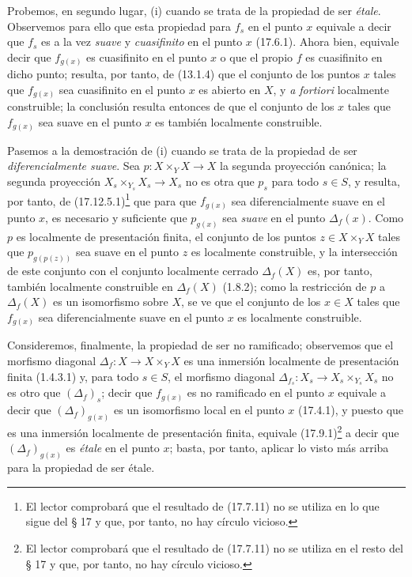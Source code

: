 Probemos, en segundo lugar, (i) cuando se trata de la propiedad de ser \emph{étale}. Observemos para ello que esta propiedad para $f_s$ en el punto $x$ equivale a decir que $f_s$ es a la vez \emph{suave} y \emph{cuasifinito} en el punto $x$ (17.6.1). Ahora bien, equivale decir que $f_{g(x)}$ es cuasifinito en el punto $x$ o que el propio $f$ es cuasifinito en dicho punto; resulta, por tanto, de (13.1.4) que el conjunto de los puntos $x$ tales que $f_{g(x)}$ sea cuasifinito en el punto $x$ es abierto en $X$, y \emph{a fortiori} localmente construible; la conclusión resulta entonces de que el conjunto de los $x$ tales que $f_{g(x)}$ sea suave en el punto $x$ es también localmente construible.

Pasemos a la demostración de (i) cuando se trata de la propiedad de ser \emph{diferencialmente suave}. Sea $p:X\times_Y X\to X$ la segunda proyección canónica; la segunda proyección $X_s\times_{Y_s}X_s\to X_s$ no es otra que $p_s$ para todo $s\in S$, y resulta, por tanto, de (17.12.5.1)\footnote{El lector comprobará que el resultado de (17.7.11) no se utiliza en lo que sigue del § 17 y que, por tanto, no hay círculo vicioso.} que para que $f_{g(x)}$ sea diferencialmente suave en el punto $x$, es necesario y suficiente que $p_{g(x)}$ sea \emph{suave} en el punto $\Delta_f(x)$. Como $p$ es localmente de presentación finita, el conjunto de los puntos $z\in X\times_Y X$ tales que $p_{g(p(z))}$ sea suave en el punto $z$ es localmente construible, y la intersección de este conjunto con el conjunto localmente cerrado $\Delta_f(X)$ es, por tanto, también localmente construible en $\Delta_f(X)$ (1.8.2); como la restricción de $p$ a $\Delta_f(X)$ es un isomorfismo sobre $X$, se ve que el conjunto de los $x\in X$ tales que $f_{g(x)}$ sea diferencialmente suave en el punto $x$ es localmente construible.

Consideremos, finalmente, la propiedad de ser no ramificado; observemos que el morfismo diagonal $\Delta_f:X\to X\times_Y X$ es una inmersión localmente de presentación finita (1.4.3.1) y, para todo $s\in S$, el morfismo diagonal $\Delta_{f_s}:X_s\to X_s\times_{Y_s}X_s$ no es otro que $(\Delta_f)_s$; decir que $f_{g(x)}$ es no ramificado en el punto $x$ equivale a decir que $(\Delta_f)_{g(x)}$ es un isomorfismo local en el punto $x$ (17.4.1), y puesto que es una inmersión localmente de presentación finita, equivale (17.9.1)\footnote{El lector comprobará que el resultado de (17.7.11) no se utiliza en el resto del § 17 y que, por tanto, no hay círculo vicioso.} a decir que $(\Delta_f)_{g(x)}$ es \emph{étale} en el punto $x$; basta, por tanto, aplicar lo visto más arriba para la propiedad de ser étale.

